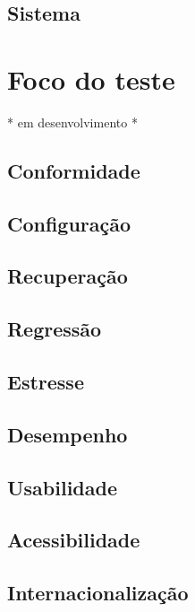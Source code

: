 \documentclass[
	12pt,				%
	openright,			%
	oneside,			%
	a4paper,			%
	english,			%
	brazil,				%
	]{abntex2}
\begin{document}
\subsection{Sistema}

\section{Foco do teste}
* em desenvolvimento *

\subsection{Conformidade}

\subsection{Configuração}

\subsection{Recuperação}

\subsection{Regressão}

\subsection{Estresse}

\subsection{Desempenho}

\subsection{Usabilidade}

\subsection{Acessibilidade}

\subsection{Internacionalização}
\end{document}
